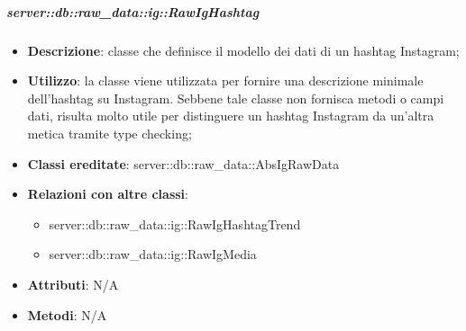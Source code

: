 		\subparagraph{server::db::raw\_data::ig::RawIgHashtag} %
		\label{subp:server_db_raw_data_ig_rawighashtag}
			\begin{itemize}
				\item \textbf{Descrizione}: classe che definisce il modello dei dati di un hashtag Instagram;
				\item \textbf{Utilizzo}: la classe viene utilizzata per fornire una descrizione minimale dell'hashtag su Instagram. Sebbene tale classe non fornisca metodi o campi dati, risulta molto utile per distinguere un hashtag Instagram da un'altra metica tramite type checking;
				\item \textbf{Classi ereditate}: server::db::raw\_data::AbsIgRawData
				\item \textbf{Relazioni con altre classi}:
					\begin{itemize}
						\item server::db::raw\_data::ig::RawIgHashtagTrend
						\item server::db::raw\_data::ig::RawIgMedia
					\end{itemize}
				\item \textbf{Attributi}: N/A
				\item \textbf{Metodi}: N/A
			\end{itemize}



